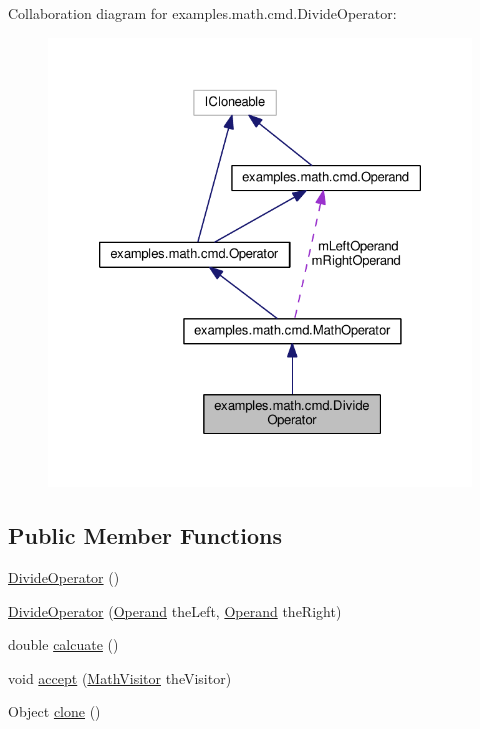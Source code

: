 Collaboration diagram for examples.\-math.\-cmd.\-Divide\-Operator\-:
\nopagebreak
\begin{figure}[H]
\begin{center}
\leavevmode
\includegraphics[width=326pt]{classexamples_1_1math_1_1cmd_1_1_divide_operator__coll__graph}
\end{center}
\end{figure}
\subsection*{Public Member Functions}
\begin{DoxyCompactItemize}
\item 
\hyperlink{classexamples_1_1math_1_1cmd_1_1_divide_operator_a2a37dc2f7e18a96d124d2e79c0b0aa37}{Divide\-Operator} ()
\item 
\hyperlink{classexamples_1_1math_1_1cmd_1_1_divide_operator_a3bd3983c44de5551cd3f14e3b8e3fade}{Divide\-Operator} (\hyperlink{interfaceexamples_1_1math_1_1cmd_1_1_operand}{Operand} the\-Left, \hyperlink{interfaceexamples_1_1math_1_1cmd_1_1_operand}{Operand} the\-Right)
\item 
double \hyperlink{classexamples_1_1math_1_1cmd_1_1_divide_operator_ad828845a8752d36f022c5099f3b09dfc}{calcuate} ()
\item 
void \hyperlink{classexamples_1_1math_1_1cmd_1_1_divide_operator_a35ebc7a09b5ba64f61f02419caf1f5aa}{accept} (\hyperlink{interfaceexamples_1_1math_1_1_math_visitor}{Math\-Visitor} the\-Visitor)
\item 
Object \hyperlink{classexamples_1_1math_1_1cmd_1_1_divide_operator_a2017f1d531290eb767f9f17417388109}{clone} ()
\end{DoxyCompactItemize}
